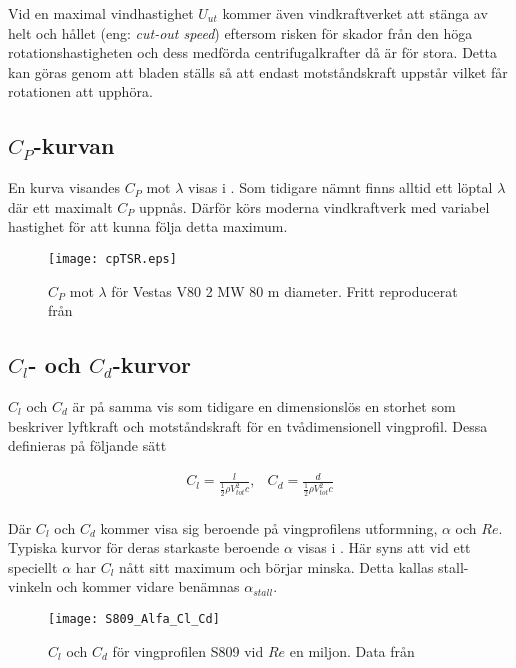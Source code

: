 Vid en maximal vindhastighet $U_{ut}$ kommer även vindkraftverket att stänga av helt och hållet (eng: \emph{cut-out speed}) eftersom risken för skador från den höga rotationshastigheten och dess medförda centrifugalkrafter då är för stora. Detta kan göras genom att bladen ställs så att endast motståndskraft uppstår vilket får rotationen att upphöra. 

\pagebreak
\subsection{$C_P$-kurvan}

En kurva visandes $C_P$ mot $\lambda$ visas i . Som tidigare nämnt finns alltid ett löptal $\lambda$ där ett maximalt $C_P$ uppnås. Därför körs moderna vindkraftverk med variabel hastighet för att kunna följa detta maximum.

\begin{figure}[!h]
  \centering
  \texttt{[image: cpTSR.eps]}
  \caption{$C_P$ mot $\lambda$ för Vestas V80 2 MW 80 m diameter. Fritt reproducerat från \citet{smallwindturbines}}
  \label{cpTSR}
\end{figure}

\pagebreak
\subsection{$C_l$- och $C_d$-kurvor}
\label{ClochCdkurvor}


$C_l$ och $C_d$ är på samma vis som tidigare en dimensionslös en storhet som beskriver lyftkraft och motståndskraft för en tvådimensionell vingprofil. Dessa definieras på följande sätt

\begin{equation}\label{c_l}
\begin{array}{cc}
C_l = \frac{l}{\frac{1}{2}\rho V_{tot}^2   c}, & C_d = \frac{d}{\frac{1}{2}\rho V_{tot}^2   c} \\ 
\end{array}
\end{equation}


Där $C_l$ och $C_d$ kommer visa sig beroende på vingprofilens utformning, $\alpha$ och $Re$. Typiska kurvor för deras starkaste beroende $\alpha$ visas i . Här syns att vid ett speciellt $\alpha$ har $C_l$ nått sitt maximum och börjar minska. Detta kallas stall-vinkeln och kommer vidare benämnas $\alpha_{stall}$. 

\begin{figure}[!h]
  \centering
  \texttt{[image: S809\_Alfa\_Cl\_Cd]}
  \caption{$C_l$ och $C_d$ för vingprofilen S809 vid $Re$ en miljon. Data från \citet{s809data}}
  \label{ClCd}
\end{figure}



